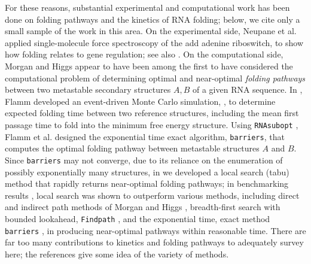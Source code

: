 For these reasons, substantial experimental and computational work
has been done on folding pathways and the kinetics of RNA folding;
below, we cite only a small sample of the work in this area.
On the experimental side,
Neupane et al. \cite{Neupane.nar11} applied single-molecule force spectroscopy
of the add adenine riboswitch, to show how folding  relates to
gene regulation;
see also \cite{Woodside.cocb08,Baird.jacs10,Mitra.r11}.
%
On the computational side, Morgan and Higgs \cite{morganHiggsBarrier}
appear to have been among the first
to have considered the computational problem of determining optimal and
near-optimal {\em folding pathways} between two metastable secondary
structures $A,B$ of a given RNA sequence.  In \cite{flammPhD}, Flamm
developed an event-driven Monte Carlo simulation, \kinfold,
to determine expected
folding time between two reference structures, including the mean first
passage time to fold into the minimum free energy structure.
Using {\tt RNAsubopt}  \cite{Wuchty.b99}, Flamm et al.
\cite{flamm} designed the exponential
time exact algorithm, {\tt barriers}, that computes the optimal folding
pathway between metastable structures $A$ and $B$. Since {\tt barriers}
may not converge, due to its reliance on the enumeration of possibly
exponentially many structures, in \cite{Dotu.nar10} we developed a
local search (tabu) method that rapidly returns near-optimal folding
pathways; in benchmarking results \cite{Dotu.nar10}, local search was shown
to outperform various methods, including direct and indirect path methods
of Morgan and Higgs \cite{morganHiggsBarrier}, breadth-first search with
bounded lookahead, {\tt Findpath} \cite{Flamm.r01}, and the
exponential time, exact method {\tt barriers} \cite{flamm}, in producing
near-optimal pathways within
reasonable time.
There are far too many contributions to kinetics and folding pathways
to adequately survey here; the references
\cite{Xayaphoummine.nar05,Tang.jmb08,Geis.jmb08,Zhao.bj10,Li.bb12}
give some idea of the variety of methods.

